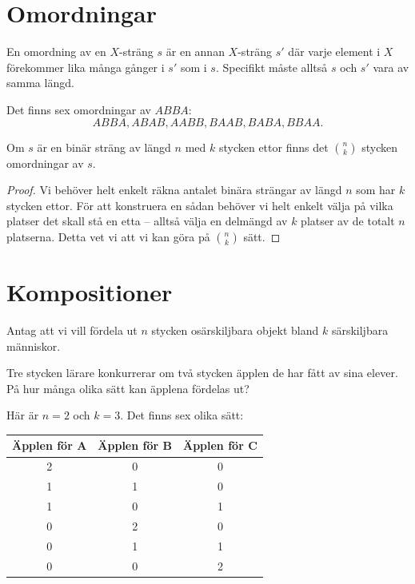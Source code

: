 \documentclass[nobib]{tufte-handout}
\begin{document}
\section{Omordningar}

\begin{definition}
  En omordning av en $X$-sträng $s$ är en annan $X$-sträng $s'$ där varje element i $X$ förekommer lika många gånger i $s'$ som i $s$. Specifikt måste alltså $s$ och $s'$ vara av samma längd.
\end{definition}

\begin{example}
  Det finns sex omordningar av $ABBA$:
  $$ABBA, ABAB, AABB, BAAB, BABA, BBAA.$$
\end{example}

\begin{proposition}\label{proposition_count_binary_rearrangements}
  Om $s$ är en binär sträng av längd $n$ med $k$ stycken ettor finns det $\binom{n}{k}$ stycken omordningar av $s$.
  \begin{proof}
    Vi behöver helt enkelt räkna antalet binära strängar av längd $n$ som har $k$ stycken ettor. För att konstruera en sådan behöver vi helt enkelt välja på vilka platser det skall stå en etta -- alltså välja en delmängd av $k$ platser av de totalt $n$ platserna. Detta vet vi att vi kan göra på $\binom{n}{k}$ sätt.
  \end{proof}
\end{proposition}

\section{Kompositioner}

Antag att vi vill fördela ut $n$ stycken osärskiljbara objekt bland $k$ särskiljbara människor.

\begin{example}
  Tre stycken lärare konkurrerar om två stycken äpplen de har fått av sina elever. På hur många olika sätt kan äpplena fördelas ut?

  Här är $n=2$ och $k=3$. Det finns sex olika sätt:
  \begin{table}[h]
    \begin{tabularx}{0.7\textwidth}{ccc}
    Äpplen för A & Äpplen för B      & Äpplen för C \\ 
    \midrule
    2 & 0 & 0\\
    1 & 1 & 0\\
    1 & 0 & 1\\
    0 & 2 & 0\\
    0 & 1 & 1\\
    0 & 0 & 2
    \end{tabularx}
    \end{table}
\end{example}
\end{document}

